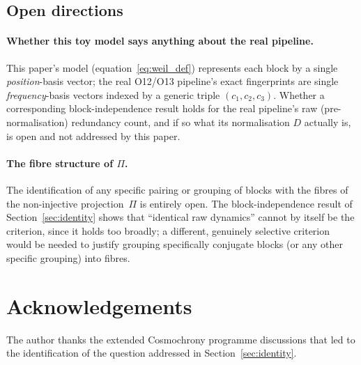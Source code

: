 \documentclass[11pt,a4paper]{article}
\theoremstyle{definition}
\begin{document}
  \subsection{Open directions}

    \paragraph{Whether this toy model says anything about the real pipeline.}
      This paper's model (equation~\eqref{eq:weil_def}) represents each
      block by a single \emph{position}-basis vector; the real O12/O13
      pipeline's exact fingerprints are single \emph{frequency}-basis
      vectors indexed by a generic triple $(c_1,c_2,c_3)$.
      Whether a corresponding block-independence result holds for the
      real pipeline's raw (pre-normalisation) redundancy count, and if
      so what its normalisation $D$ actually is, is open and not
      addressed by this paper.

    \paragraph{The fibre structure of $\Pi$.}
      The identification of any specific pairing or grouping of blocks
      with the fibres of the non-injective projection~$\Pi$ is
      entirely open.
      The block-independence result of Section~\ref{sec:identity} shows
      that ``identical raw dynamics'' cannot by itself be the criterion,
      since it holds too broadly; a different, genuinely selective
      criterion would be needed to justify grouping specifically
      conjugate blocks (or any other specific grouping) into fibres.

  \section*{Acknowledgements}

  The author thanks the extended Cosmochrony programme discussions that
  led to the identification of the question addressed in
  Section~\ref{sec:identity}.

  
  \begingroup
  \raggedright
  
  \endgroup
\end{document}
